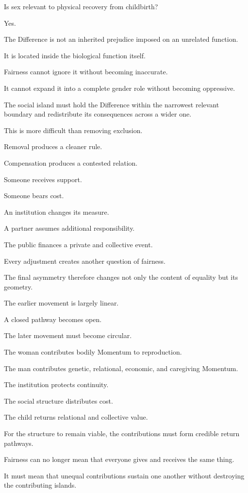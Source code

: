 Is sex relevant to physical recovery from childbirth?

Yes.

The Difference is not an inherited prejudice imposed on an unrelated function.

It is located inside the biological function itself.

Fairness cannot ignore it without becoming inaccurate.

It cannot expand it into a complete gender role without becoming oppressive.

The social island must hold the Difference within the narrowest relevant boundary and redistribute its consequences across a wider one.

This is more difficult than removing exclusion.

Removal produces a cleaner rule.

Compensation produces a contested relation.

Someone receives support.

Someone bears cost.

An institution changes its measure.

A partner assumes additional responsibility.

The public finances a private and collective event.

Every adjustment creates another question of fairness.

The final asymmetry therefore changes not only the content of equality but its geometry.

The earlier movement is largely linear.

A closed pathway becomes open.

The later movement must become circular.

The woman contributes bodily Momentum to reproduction.

The man contributes genetic, relational, economic, and caregiving Momentum.

The institution protects continuity.

The social structure distributes cost.

The child returns relational and collective value.

For the structure to remain viable, the contributions must form credible return pathways.

Fairness can no longer mean that everyone gives and receives the same thing.

It must mean that unequal contributions sustain one another without destroying the contributing islands.

